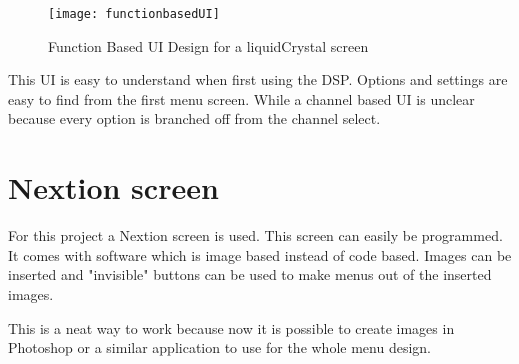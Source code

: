 \begin{figure}[ht]
    \texttt{[image: functionbasedUI]}
    \caption{Function Based UI Design for a liquidCrystal screen}
    \label{fig:functionbasedUI}
\end{figure}

This UI is easy to understand when first using the DSP. Options and settings are easy to find from the first menu screen. While a channel based UI is unclear because every option is branched off from the channel select.

\section{Nextion screen}

For this project a Nextion screen is used. This screen can easily be programmed. It comes with software which is image based instead of code based. Images can be inserted and "invisible" buttons can be used to make menus out of the inserted images.

This is a neat way to work because now it is possible to create images in Photoshop or a similar application to use for the whole menu design.